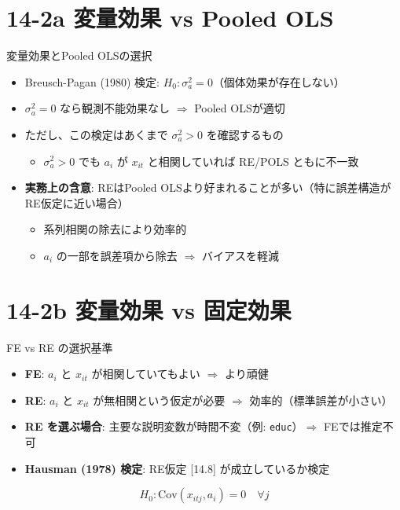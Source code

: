 \documentclass[
  ignorenonframetext,
]{beamer}
\providecommand{\tightlist}{%
  \setlength{\itemsep}{0pt}\setlength{\parskip}{0pt}}
\begin{document}
\section{14-2a 変量効果 vs Pooled
OLS}\label{a-ux5909ux91cfux52b9ux679c-vs-pooled-ols}

\begin{frame}{変量効果とPooled OLSの選択}
\label{ux5909ux91cfux52b9ux679cux3068pooled-olsux306eux9078ux629e}
\begin{itemize}
\tightlist
\item
  Breusch-Pagan (1980) 検定:
  \(H_0: \sigma_a^2 = 0\)（個体効果が存在しない）
\item
  \(\sigma_a^2 = 0\) なら観測不能効果なし \(\Rightarrow\) Pooled
  OLSが適切
\item
  ただし、この検定はあくまで \(\sigma_a^2 > 0\) を確認するもの

  \begin{itemize}
  \tightlist
  \item
    \(\sigma_a^2 > 0\) でも \(a_i\) が \(x_{it}\) と相関していれば
    RE/POLS ともに不一致
  \end{itemize}
\item
  \textbf{実務上の含意}: REはPooled
  OLSより好まれることが多い（特に誤差構造がRE仮定に近い場合）

  \begin{itemize}
  \tightlist
  \item
    系列相関の除去により効率的
  \item
    \(a_i\) の一部を誤差項から除去 \(\Rightarrow\) バイアスを軽減
  \end{itemize}
\end{itemize}
\end{frame}

\section{14-2b 変量効果 vs
固定効果}\label{b-ux5909ux91cfux52b9ux679c-vs-ux56faux5b9aux52b9ux679c}

\begin{frame}[fragile]{FE vs RE の選択基準}
\label{fe-vs-re-ux306eux9078ux629eux57faux6e96}
\begin{itemize}
\tightlist
\item
  \textbf{FE}: \(a_i\) と \(x_{it}\) が相関していてもよい
  \(\Rightarrow\) より頑健
\item
  \textbf{RE}: \(a_i\) と \(x_{it}\) が無相関という仮定が必要
  \(\Rightarrow\) 効率的（標準誤差が小さい）
\item
  \textbf{RE を選ぶ場合}: 主要な説明変数が時間不変（例:
  \texttt{educ}）\(\Rightarrow\) FEでは推定不可
\item
  \textbf{Hausman (1978) 検定}: RE仮定 {[}14.8{]} が成立しているか検定
\end{itemize}

\[H_0: \text{Cov}(x_{itj}, a_i) = 0 \quad \forall j\]
\end{frame}
\end{document}
